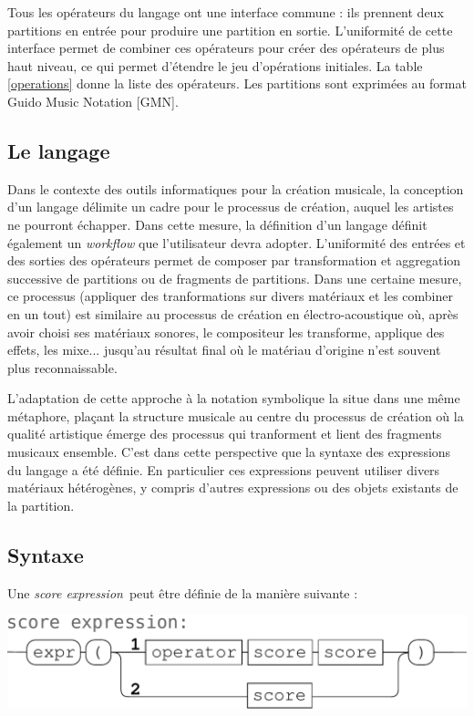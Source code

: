 \documentclass{article}
\newcommand{\sExpr}{\emph{score expression}}
\begin{document}
Tous les opérateurs du langage ont une interface commune : ils prennent deux partitions en entrée pour produire une partition en sortie. L'uniformité de cette interface permet de combiner ces opérateurs pour créer des opérateurs de plus haut niveau, ce qui permet d'étendre le jeu d'opérations initiales. La table \ref{operations} donne la liste des opérateurs.
Les partitions sont exprimées au format Guido Music Notation [GMN]\cite{hoos98}. 


\subsection{Le langage}

Dans le contexte des outils informatiques pour la création musicale, la conception d'un langage délimite un cadre pour le processus de création, auquel les artistes ne pourront échapper. Dans cette mesure, la définition d'un langage définit également un \textit{workflow} que l'utilisateur devra adopter. 
L'uniformité des entrées et des sorties des opérateurs permet de composer par transformation et aggregation successive de partitions ou de fragments de partitions. Dans une certaine mesure, ce processus (appliquer des tranformations sur divers matériaux et les combiner en un tout) est similaire au processus de création en électro-acoustique où, après avoir choisi ses matériaux sonores, le compositeur les transforme, applique des effets, les mixe... jusqu'au résultat final où le matériau d'origine n'est souvent plus reconnaissable.

L'adaptation de cette approche à la notation symbolique la situe dans une même métaphore, plaçant la structure musicale au centre du processus de création où la qualité artistique émerge des processus qui tranforment et lient des fragments musicaux ensemble.
C'est dans cette perspective que la syntaxe des expressions du langage a été définie. En particulier ces expressions peuvent utiliser divers matériaux hétérogènes, y compris d'autres expressions ou des objets existants de la partition.


\subsection{Syntaxe}
Une \sExpr\ peut être définie de la manière suivante :
\begin{center}
\includegraphics[width=0.9\columnwidth]{imgs/syntax1}
\end{center}
\end{document}
